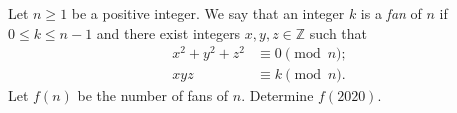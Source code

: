 Let $n\geq 1$ be a positive integer. We say that an integer $k$ is a \emph{fan} of $n$ if $0\leq k\leq n-1$ and there exist integers $x,y,z\in\mathbb{Z}$ such that
\begin{align*}
x^2+y^2+z^2 &\equiv 0 \pmod n;\\
xyz &\equiv k \pmod n.
\end{align*}Let $f(n)$ be the number of fans of $n$. Determine $f(2020)$.